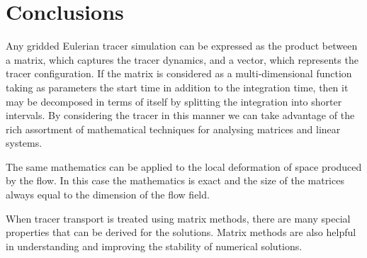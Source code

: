 \documentclass[11pt]{article}
\begin{document}
\section{Conclusions}

Any gridded Eulerian tracer simulation can be expressed as the product between a matrix,
which captures the tracer dynamics, and a vector, which represents the tracer
configuration.  If the matrix is considered as a multi-dimensional function
taking as parameters the start time 
in addition to the integration time, then it may be decomposed in terms of
itself by splitting the integration into shorter intervals.  
By considering the tracer in this manner we can take advantage of the rich
assortment of mathematical techniques for analysing matrices and linear systems.

The same mathematics can be applied to the local deformation of space produced
by the flow.  In this case the mathematics is exact and the size of the matrices
always equal to the dimension of the flow field.

When tracer transport is treated using matrix methods, there
are many special properties that can be derived for the solutions.  
Matrix methods are also
helpful in understanding and improving the stability of numerical solutions.




\end{document}
